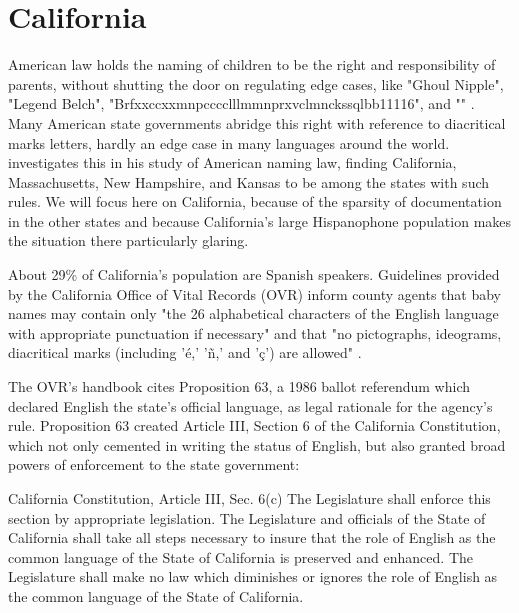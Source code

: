 \section{California}

American law holds the naming of children to be the right and responsibility of
parents, without shutting the door on regulating edge cases, like "Ghoul
Nipple", "Legend Belch", "Brfxxccxxmnpcccclllmmnprxvclmnckssqlbb11116", and ""
\parencite{larson11}. Many American state governments abridge this right with
reference to diacritical marks letters, hardly an edge case in many languages
around the world. \textcite[5]{larson11} investigates this in his study of
American naming law, finding California, Massachusetts, New Hampshire, and
Kansas to be among the states with such rules. We will focus here on California,
because of the sparsity of documentation in the other states and because
California's large Hispanophone population makes the situation there
particularly glaring.

About 29\% of California's population are Spanish speakers.
\parencite{acs-lang-states} Guidelines provided by the California Office of
Vital Records (OVR) inform county agents that baby names may contain only "the
26 alphabetical characters of the English language with appropriate punctuation
if necessary" and that "no pictographs, ideograms, diacritical marks (including
'é,' 'ñ,' and 'ç') are allowed" \parencite{larson11}.

The OVR's handbook cites Proposition 63, a 1986 ballot referendum which declared
English the state's official language, as legal rationale for the agency's rule.
Proposition 63 created Article III, Section 6 of the California Constitution,
which not only cemented in writing the status of English, but also granted broad
powers of enforcement to the state government: 

\begin{aquote}{California Constitution, Article III, Sec. 6(c)}
The Legislature shall enforce this section by appropriate legislation. The
Legislature and officials of the State of California shall take all steps
necessary to insure that the role of English as the common language of the State
of California is preserved and enhanced. The Legislature shall make no law which
diminishes or ignores the role of English as the common language of the State of
California.
\end{aquote}

